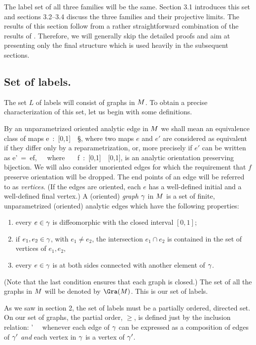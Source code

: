 The label set of all three families will be the same. Section 3.1
introduces this set and sections 3.2--3.4 discuss the three
families and their projective limits. The results of this section
follow from a rather straightforward combination of the results of
\cite{AL1,B1,B2,MM,AL2}.  Therefore, we will generally skip the
detailed proofs and aim at presenting only the final structure which
is used heavily in the subsequent sections.


\subsection{Set of labels.}

The set $L$ of labels will consist of graphs in $\S$. To obtain a
precise characterization of this set, let us begin with some
definitions.

By an unparametrized oriented analytic edge in $\S$ we shall mean
an equivalence class of maps
\be %
e\ :\ [0,1]\ \rightarrow\ \S,
\ee %
where two maps $e$ and $e'$ are considered as equivalent if they
differ only by a reparametrization, or, more precisely if $e'$ can be
written as
\be
e'\ =\ e\circ f,\ \ \ {\rm where} \ \ \ f\ :\ [0,1]\ \rightarrow \
[0,1],
\ee
is an analytic orientation preserving bijection. We will also consider
unoriented edges for which the requirement that $f$ preserve
orientation will be dropped.  The end points of an edge will be
referred to as {\it vertices}. (If the edges are oriented, each $e$
has a well-defined initial and a well-defined final vertex.) A
(oriented) {\it graph} $\g$ in $\S$ is a set of finite, unparametrized
(oriented) analytic edges which have the following properties:
\begin{enumerate}
\item every $e\in\g$ is diffeomorphic with the closed interval $[0,1]$;
\item if $e_1,e_2\in\g$, with $e_1\not= e_2$, the intersection $e_1\cap 
e_2$ is contained in the set of vertices of $e_1,e_2$,
\item every $e\in\g$ is at both sides connected with
another element of $\g$.
\end{enumerate}
\noindent 
(Note that the last condition ensures that each graph is closed.)  The
set of all the graphs in $\S$ will be denoted by $\Gra(\S)$. This is
our set of labels.

As we saw in section 2, the set of labels must be a partially ordered,
directed set. On our set of graphs, the partial order, $\ge$, is
defined just by the inclusion relation:
\be
\g'\ \ge\ \g
\ee
whenever each edge of $\g$ can be expressed as a composition of edges
of $\g'$ {\it and} each vertex in $\g$ is a vertex of $\g'$.

